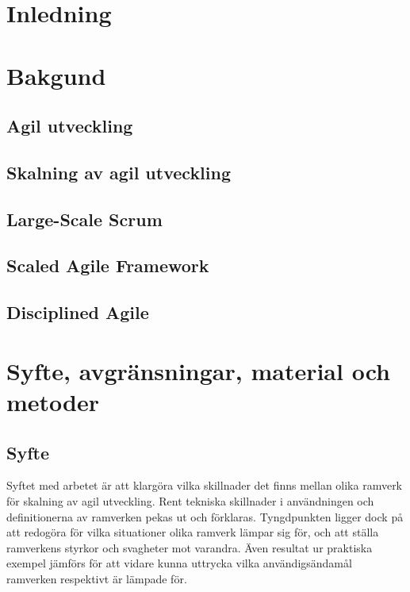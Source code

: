 \section{Inledning}


\newpage

\section{Bakgund} 	


\subsection{Agil utveckling}


\subsection{Skalning av agil utveckling}


\subsection{Large-Scale Scrum}


\subsection{Scaled Agile Framework}


\subsection{Disciplined Agile}


	
\newpage

\section{Syfte, avgränsningar, material och metoder}


\subsection{Syfte}

Syftet med arbetet är att klargöra vilka skillnader det finns mellan olika ramverk för skalning av agil utveckling. Rent tekniska skillnader i användningen och definitionerna av ramverken pekas ut och förklaras.
Tyngdpunkten ligger dock på att redogöra för vilka situationer olika ramverk lämpar sig för, och att ställa ramverkens styrkor och svagheter mot varandra. Även resultat ur praktiska exempel jämförs för att vidare kunna uttrycka vilka användigsändamål ramverken respektivt är lämpade för.


